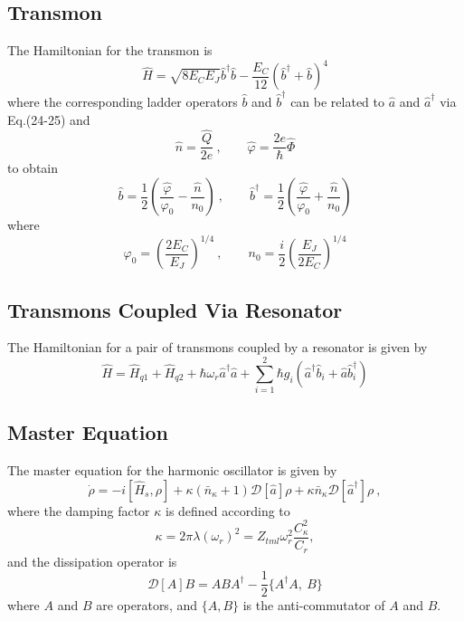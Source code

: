 \documentclass[10pt,a4paper,fleqn]{article}
\newcommand{\hamH}{\hat{H}}
\newcommand{\hPhi}{\hat{\Phi}}
\newcommand{\hQ}{\hat{Q}}
\newcommand{\tranOp}{\hat{b}}
\newcommand{\bS}{\bar{n}_\kappa}
\newcommand{\dissOp}{\mathcal{D}}
\newcommand{\oscLad}{\hat{a}}
\begin{document}
\subsection{Transmon} %
The Hamiltonian for the transmon is
\begin{equation}\label{eq:transHamil}\tag{27}
	\hamH = \sqrt{8E_C E_J}\tranOp^\dag \tranOp - \dfrac{E_C}{12}(\tranOp^\dag + \tranOp)^4
\end{equation}
where the corresponding ladder operators $ \tranOp $ and $ \tranOp^\dag $ can be related to $ \oscLad $ and $ \oscLad^\dag $ via Eq.(24-25) and
\begin{equation}\label{eq:tranOps}\tag{22in} %
	\hat{n} = \dfrac{\hQ}{2e} \ , \qquad
	\hat{\varphi} = \dfrac{2e}{\hbar}\hPhi
\end{equation}
to obtain
\begin{equation}\label{eq:tranLad}\tag{25-26der}
	\tranOp = \dfrac{1}{2}\left( \dfrac{\hat{\varphi}}{\varphi_0} - \dfrac{\hat{n}}{n_0} \right) \ , \qquad
	\tranOp^\dag = \dfrac{1}{2}\left( \dfrac{\hat{\varphi}}{\varphi_0} + \dfrac{\hat{n}}{n_0} \right)
\end{equation}
where
\begin{equation}\label{eq:tranCoeff}\tag{25-26der-a}
	\varphi_0 = \left(\dfrac{2E_C}{E_J}\right)^{1/4} \ , \qquad
	n_0 = \dfrac{i}{2}\left( \dfrac{E_J}{2E_C} \right)^{1/4}
\end{equation}



\subsection{Transmons Coupled Via Resonator}
The Hamiltonian for a pair of transmons coupled by a resonator is given by
\begin{equation}\label{eq:resCoupleTrans}\tag{138}
	\hamH = \hamH_{q1} + \hamH_{q2} + \hbar\omega_r\oscLad^\dag\oscLad + \sum_{i=1}^{2}\hbar g_i(\oscLad^\dag\tranOp_i + \oscLad\tranOp_i^\dag)
\end{equation}


\subsection{Master Equation} %
The master equation for the harmonic oscillator is given by
\begin{equation}\label{eq:masterEq}\tag{70}
	\dot{\rho} = -i[\hamH_s, \rho] + \kappa(\bS + 1)\dissOp[\oscLad]\rho + \kappa\bS\dissOp[\oscLad^\dag]\rho \ ,
\end{equation}
where the damping factor $ \kappa $ is defined according to
\[
	\kappa = 2\pi\lambda(\omega_r)^2 = Z_{tml}\omega_r^2\dfrac{C_\kappa^2}{C_r},
\]
and the dissipation operator is
\begin{equation}\label{eq:dissOp}\tag{71}
	\dissOp[A]B = ABA^\dag - \dfrac{1}{2}\lbrace A^\dag A, \ B \rbrace
\end{equation}
where $ A $ and $ B $ are operators, and $ \lbrace A, B \rbrace$ is the anti-commutator of $ A $ and $ B $.
\end{document}
